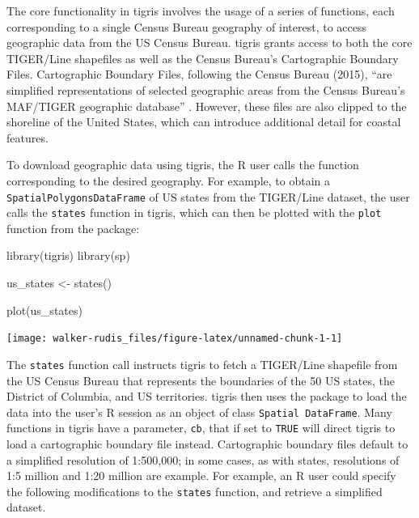 The core functionality in tigris involves the usage of a series of
functions, each corresponding to a single Census Bureau geography of
interest, to access geographic data from the US Census Bureau. tigris
grants access to both the core TIGER/Line shapefiles as well as the
Census Bureau's Cartographic Boundary Files. Cartographic Boundary
Files, following the Census Bureau (2015), ``are simplified
representations of selected geographic areas from the Census Bureau's
MAF/TIGER geographic database'' \citep{Census2015}. However, these files
are also clipped to the shoreline of the United States, which can
introduce additional detail for coastal features.

To download geographic data using tigris, the R user calls the function
corresponding to the desired geography. For example, to obtain a
\texttt{SpatialPolygonsDataFrame} of US states from the TIGER/Line
dataset, the user calls the \texttt{states} function in tigris, which
can then be plotted with the \texttt{plot} function from the
 package:

\begin{Schunk}
\begin{Sinput}
library(tigris)
library(sp)

us_states <- states()

plot(us_states)
\end{Sinput}

\texttt{[image: walker-rudis\_files/figure-latex/unnamed-chunk-1-1]} \end{Schunk}

The \texttt{states} function call instructs tigris to fetch a TIGER/Line
shapefile from the US Census Bureau that represents the boundaries of
the 50 US states, the District of Columbia, and US territories. tigris
then uses the  package to load the data into the user's R
session as an object of class \texttt{Spatial\ DataFrame}. Many
functions in tigris have a parameter, \texttt{cb}, that if set to
\texttt{TRUE} will direct tigris to load a cartographic boundary file
instead. Cartographic boundary files default to a simplified resolution
of 1:500,000; in some cases, as with states, resolutions of 1:5 million
and 1:20 million are example. For example, an R user could specify the
following modifications to the \texttt{states} function, and retrieve a
simplified dataset.

